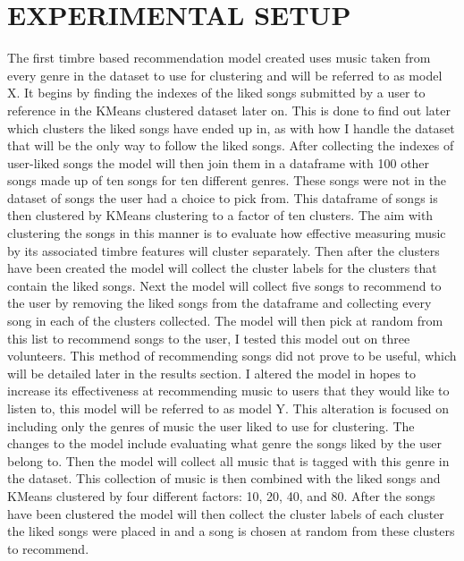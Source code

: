 \documentclass[letterpaper, 10 pt, conference]{ieeeconf}
\begin{document}
\section{EXPERIMENTAL SETUP}
The first timbre based recommendation model created uses music taken from every genre in the dataset to use for clustering and will be referred to as model X. It begins by finding the indexes of the liked songs submitted by a user to reference in the KMeans clustered dataset later on. This is done to find out later which clusters the liked songs have ended up in, as with how I handle the dataset that will be the only way to follow the liked songs. After collecting the indexes of user-liked songs the model will then join them in a dataframe with 100 other songs made up of ten songs for ten different genres. These songs were not in the dataset of songs the user had a choice to pick from. This dataframe of songs is then clustered by KMeans clustering to a factor of ten clusters. The aim with clustering the songs in this manner is to evaluate how effective measuring music by its associated timbre features will cluster separately. Then after the clusters have been created the model will collect the cluster labels for the clusters that contain the liked songs. Next the model will collect five songs to recommend to the user by removing the liked songs from the dataframe and collecting every song in each of the clusters collected. The model will then pick at random from this list to recommend songs to the user, I tested this model out on three volunteers. This method of recommending songs did not prove to be useful, which will be detailed later in the results section. I altered the model in hopes to increase its effectiveness at recommending music to users that they would like to listen to, this model will be referred to as model Y. This alteration is focused on including only the genres of music the user liked to use for clustering. The changes to the model include evaluating what genre the songs liked by the user belong to. Then the model will collect all music that is tagged with this genre in the dataset. This collection of music is then combined with the liked songs and KMeans clustered by four different factors: 10, 20, 40, and 80. After the songs have been clustered the model will then collect the cluster labels of each cluster the liked songs were placed in and a song is chosen at random from these clusters to recommend.

\end{document}
